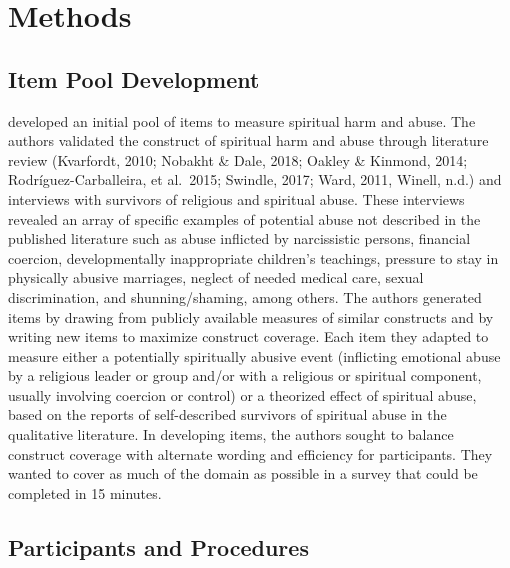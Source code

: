 \documentclass[
]{article}
\begin{document}
\hypertarget{methods}{%
\section{Methods}\label{methods}}

\hypertarget{item-pool-development}{%
\subsection{Item Pool Development}\label{item-pool-development}}

\citet{KochEdstrom2022} developed an initial pool of items to measure spiritual harm and abuse. The authors validated the construct of spiritual harm and abuse through literature review (Kvarfordt, 2010; Nobakht \& Dale, 2018; Oakley \& Kinmond, 2014; Rodríguez-Carballeira, et al.~2015; Swindle, 2017; Ward, 2011, Winell, n.d.) and interviews with survivors of religious and spiritual abuse. These interviews revealed an array of specific examples of potential abuse not described in the published literature such as abuse inflicted by narcissistic persons, financial coercion, developmentally inappropriate children's teachings, pressure to stay in physically abusive marriages, neglect of needed medical care, sexual discrimination, and shunning/shaming, among others. The authors generated items by drawing from publicly available measures of similar constructs and by writing new items to maximize construct coverage. Each item they adapted to measure either a potentially spiritually abusive event (inflicting emotional abuse by a religious leader or group and/or with a religious or spiritual component, usually involving coercion or control) or a theorized effect of spiritual abuse, based on the reports of self-described survivors of spiritual abuse in the qualitative literature. In developing items, the authors sought to balance construct coverage with alternate wording and efficiency for participants. They wanted to cover as much of the domain as possible in a survey that could be completed in 15 minutes.

\hypertarget{participants-and-procedures}{%
\subsection{Participants and Procedures}\label{participants-and-procedures}}
\end{document}
